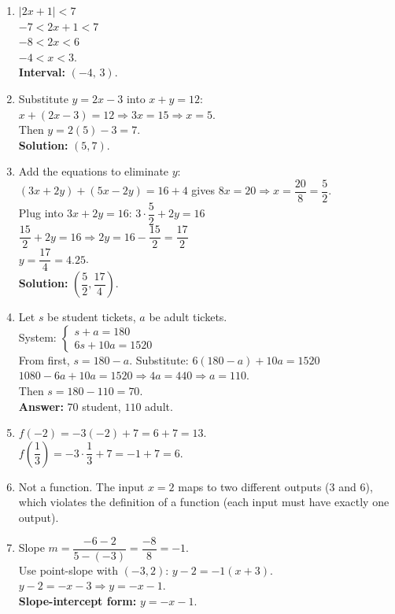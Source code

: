 \documentclass[11pt]{article}
\begin{document}
\begin{enumerate}
\item \(|2x + 1| < 7\)\\
$-7 < 2x + 1 < 7$\\
$-8 < 2x < 6$\\
$-4 < x < 3$.\\
\textbf{Interval:} $(-4,\,3)$.

\item Substitute $y=2x-3$ into $x+y=12$:\\
$x + (2x - 3) = 12 \Rightarrow 3x = 15 \Rightarrow x = 5$.\\
Then $y = 2(5) - 3 = 7$.\\
\textbf{Solution:} $(5, 7)$.

\item Add the equations to eliminate $y$:\\
$(3x + 2y) + (5x - 2y) = 16 + 4$ gives $8x = 20 \Rightarrow x = \dfrac{20}{8} = \dfrac{5}{2}$.\\
Plug into $3x + 2y = 16$: $3\cdot\dfrac{5}{2} + 2y = 16$\\
$\dfrac{15}{2} + 2y = 16 \Rightarrow 2y = 16 - \dfrac{15}{2} = \dfrac{17}{2}$\\
$y = \dfrac{17}{4} = 4.25$.\\
\textbf{Solution:} $\left(\dfrac{5}{2}, \dfrac{17}{4}\right)$.

\item Let $s$ be student tickets, $a$ be adult tickets.\\
System: $\begin{cases} s + a = 180 \\ 6s + 10a = 1520 \end{cases}$\\
From first, $s = 180 - a$. Substitute: $6(180 - a) + 10a = 1520$\\
$1080 - 6a + 10a = 1520 \Rightarrow 4a = 440 \Rightarrow a = 110$.\\
Then $s = 180 - 110 = 70$.\\
\textbf{Answer:} $70$ student, $110$ adult.

\item $f(-2) = -3(-2) + 7 = 6 + 7 = 13$.\\
$f\!\left(\dfrac{1}{3}\right) = -3\cdot\dfrac{1}{3} + 7 = -1 + 7 = 6$.

\item Not a function. The input $x=2$ maps to two different outputs (3 and 6), which violates the definition of a function (each input must have exactly one output).

\item Slope $m = \dfrac{-6 - 2}{5 - (-3)} = \dfrac{-8}{8} = -1$.\\
Use point-slope with $( -3, 2)$: $y - 2 = -1(x + 3)$.\\
$y - 2 = -x - 3 \Rightarrow y = -x - 1$.\\
\textbf{Slope-intercept form:} $y = -x - 1$.


\end{enumerate}
\end{document}

